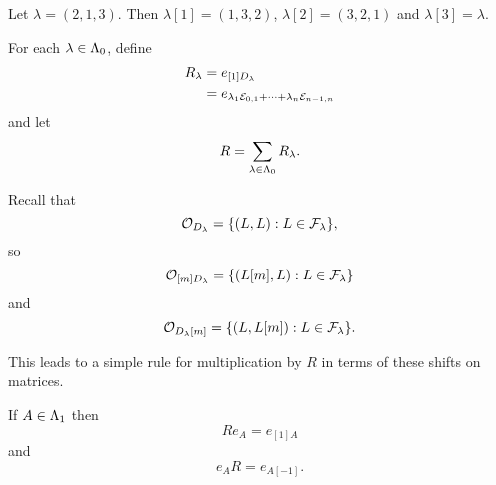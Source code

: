 \documentclass[a4paper, 11pt, twoside]{report}
\begin{document}
\begin{example}
Let $\lambda = (2,1,3)$. Then $\lambda[1]=(1,3,2)$, $\lambda[2]=(3,2,1)$ and $\lambda[3]=\lambda$.
\end{example}

For each $\lambda\in\Lambda_0{}$, define
\begin{align*}
R_\lambda &= e_{[1]D_{\lambda}}\\
&= e_{\lambda_1\mathcal{E}_{0,1}+\cdots +\lambda_n\mathcal{E}_{n-1,n}}
\end{align*}
and let
\begin{equation*}
R = \sum_{\lambda\in\Lambda_0{}} R_\lambda.
\end{equation*}

Recall that
\begin{equation*}
\mathcal{O}_{D_{\lambda}} = \{(L,L):L\in\mathcal{F}_\lambda\},
\end{equation*}
so
\begin{equation*}
\mathcal{O}_{[m]D_{\lambda}} = \{(L[m],L):L\in\mathcal{F}_\lambda\}
\end{equation*}
and
\begin{equation*}
\mathcal{O}_{D_{\lambda}[m]} = \{(L,L[m]):L\in\mathcal{F}_\lambda\}.
\end{equation*}

This leads to a simple rule for multiplication by $R$ in terms of these shifts on matrices.

\begin{lemma}\label{lemma:action-of-R}
If $A\in\Lambda_1{}$ then
\begin{equation*}
R e_A = e_{[1]A}
\end{equation*}
and
\begin{equation*}
e_A R = e_{A[-1]}.
\end{equation*}
\end{lemma}
\end{document}
